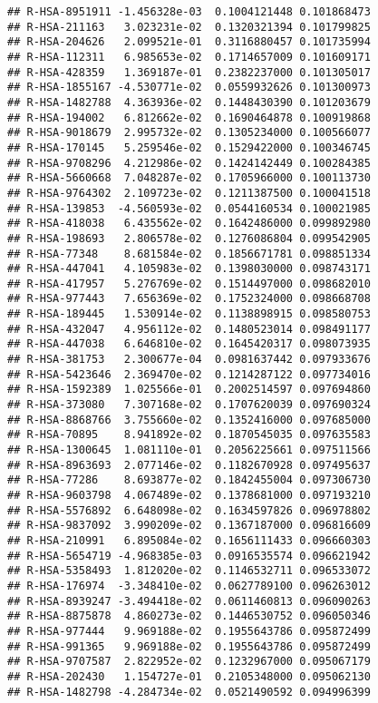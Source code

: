 \documentclass[
]{article}
\begin{document}
\begin{verbatim}
## R-HSA-8951911 -1.456328e-03  0.1004121448 0.101868473
## R-HSA-211163   3.023231e-02  0.1320321394 0.101799825
## R-HSA-204626   2.099521e-01  0.3116880457 0.101735994
## R-HSA-112311   6.985653e-02  0.1714657009 0.101609171
## R-HSA-428359   1.369187e-01  0.2382237000 0.101305017
## R-HSA-1855167 -4.530771e-02  0.0559932626 0.101300973
## R-HSA-1482788  4.363936e-02  0.1448430390 0.101203679
## R-HSA-194002   6.812662e-02  0.1690464878 0.100919868
## R-HSA-9018679  2.995732e-02  0.1305234000 0.100566077
## R-HSA-170145   5.259546e-02  0.1529422000 0.100346745
## R-HSA-9708296  4.212986e-02  0.1424142449 0.100284385
## R-HSA-5660668  7.048287e-02  0.1705966000 0.100113730
## R-HSA-9764302  2.109723e-02  0.1211387500 0.100041518
## R-HSA-139853  -4.560593e-02  0.0544160534 0.100021985
## R-HSA-418038   6.435562e-02  0.1642486000 0.099892980
## R-HSA-198693   2.806578e-02  0.1276086804 0.099542905
## R-HSA-77348    8.681584e-02  0.1856671781 0.098851334
## R-HSA-447041   4.105983e-02  0.1398030000 0.098743171
## R-HSA-417957   5.276769e-02  0.1514497000 0.098682010
## R-HSA-977443   7.656369e-02  0.1752324000 0.098668708
## R-HSA-189445   1.530914e-02  0.1138898915 0.098580753
## R-HSA-432047   4.956112e-02  0.1480523014 0.098491177
## R-HSA-447038   6.646810e-02  0.1645420317 0.098073935
## R-HSA-381753   2.300677e-04  0.0981637442 0.097933676
## R-HSA-5423646  2.369470e-02  0.1214287122 0.097734016
## R-HSA-1592389  1.025566e-01  0.2002514597 0.097694860
## R-HSA-373080   7.307168e-02  0.1707620039 0.097690324
## R-HSA-8868766  3.755660e-02  0.1352416000 0.097685000
## R-HSA-70895    8.941892e-02  0.1870545035 0.097635583
## R-HSA-1300645  1.081110e-01  0.2056225661 0.097511566
## R-HSA-8963693  2.077146e-02  0.1182670928 0.097495637
## R-HSA-77286    8.693877e-02  0.1842455004 0.097306730
## R-HSA-9603798  4.067489e-02  0.1378681000 0.097193210
## R-HSA-5576892  6.648098e-02  0.1634597826 0.096978802
## R-HSA-9837092  3.990209e-02  0.1367187000 0.096816609
## R-HSA-210991   6.895084e-02  0.1656111433 0.096660303
## R-HSA-5654719 -4.968385e-03  0.0916535574 0.096621942
## R-HSA-5358493  1.812020e-02  0.1146532711 0.096533072
## R-HSA-176974  -3.348410e-02  0.0627789100 0.096263012
## R-HSA-8939247 -3.494418e-02  0.0611460813 0.096090263
## R-HSA-8875878  4.860273e-02  0.1446530752 0.096050346
## R-HSA-977444   9.969188e-02  0.1955643786 0.095872499
## R-HSA-991365   9.969188e-02  0.1955643786 0.095872499
## R-HSA-9707587  2.822952e-02  0.1232967000 0.095067179
## R-HSA-202430   1.154727e-01  0.2105348000 0.095062130
## R-HSA-1482798 -4.284734e-02  0.0521490592 0.094996399

\end{verbatim}
\end{document}
